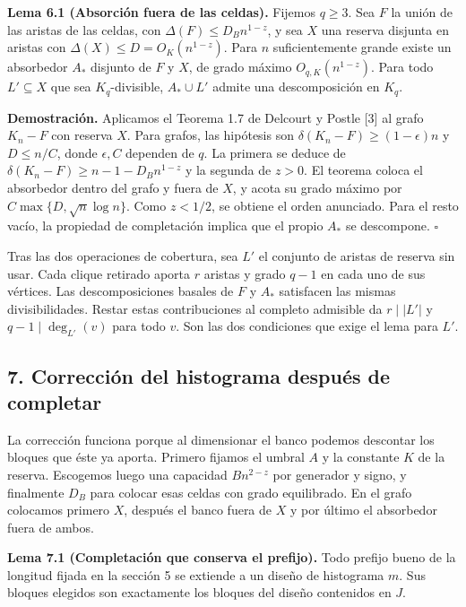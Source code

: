 \documentclass[spanish,11pt,a4paper]{article}
\begin{document}
\textbf{Lema 6.1 (Absorción fuera de las celdas).} Fijemos \(q\ge3\). Sea \(F\) la unión de las aristas de las celdas, con \(\Delta(F)\le D_Bn^{1-z}\), y sea \(X\) una reserva disjunta en aristas con \(\Delta(X)\le D=O_K(n^{1-z})\). Para \(n\) suficientemente grande existe un absorbedor \(A_*\) disjunto de \(F\) y \(X\), de grado máximo \(O_{q,K}(n^{1-z})\). Para todo \(L'\subseteq X\) que sea \(K_q\)-divisible, \(A_*\cup L'\) admite una descomposición en \(K_q\).

\textbf{Demostración.} Aplicamos el Teorema 1.7 de Delcourt y Postle {[}3{]} al grafo \(K_n-F\) con reserva \(X\). Para grafos, las hipótesis son \(\delta(K_n-F)\ge(1-\epsilon)n\) y \(D\le n/C\), donde \(\epsilon,C\) dependen de \(q\). La primera se deduce de \(\delta(K_n-F)\ge n-1-D_Bn^{1-z}\) y la segunda de \(z>0\). El teorema coloca el absorbedor dentro del grafo y fuera de \(X\), y acota su grado máximo por \(C\max\{D,\sqrt n\log n\}\). Como \(z<1/2\), se obtiene el orden anunciado. Para el resto vacío, la propiedad de completación implica que el propio \(A_*\) se descompone. \(\square\)

Tras las dos operaciones de cobertura, sea \(L'\) el conjunto de aristas de reserva sin usar. Cada clique retirado aporta \(r\) aristas y grado \(q-1\) en cada uno de sus vértices. Las descomposiciones basales de \(F\) y \(A_*\) satisfacen las mismas divisibilidades. Restar estas contribuciones al completo admisible da \(r\mid |L'|\) y \(q-1\mid\deg_{L'}(v)\) para todo \(v\). Son las dos condiciones que exige el lema para \(L'\).

\subsection{7. Corrección del histograma después de completar}\label{correcciuxf3n-del-histograma-despuuxe9s-de-completar}

La corrección funciona porque al dimensionar el banco podemos descontar los bloques que éste ya aporta. Primero fijamos el umbral \(A\) y la constante \(K\) de la reserva. Escogemos luego una capacidad \(Bn^{2-z}\) por generador y signo, y finalmente \(D_B\) para colocar esas celdas con grado equilibrado. En el grafo colocamos primero \(X\), después el banco fuera de \(X\) y por último el absorbedor fuera de ambos.

\textbf{Lema 7.1 (Completación que conserva el prefijo).} Todo prefijo bueno de la longitud fijada en la sección 5 se extiende a un diseño de histograma \(m\). Sus bloques elegidos son exactamente los bloques del diseño contenidos en \(J\).
\end{document}
